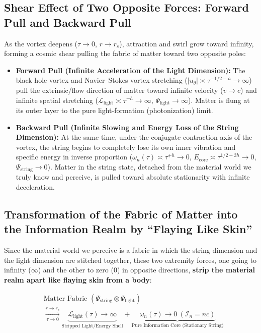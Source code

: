 \documentclass[12pt,a4paper]{article}
\begin{document}
\subsection{Shear Effect of Two Opposite Forces: Forward Pull and Backward Pull}

As the vortex deepens ($\tau \to 0$, $r \to r_s$), attraction and swirl grow toward infinity, forming a cosmic shear pulling the fabric of matter toward two opposite poles:

\begin{itemize}
    \item \textbf{Forward Pull (Infinite Acceleration of the Light Dimension):} The black hole vortex and Navier--Stokes vortex stretching ($|u_\theta| \asymp \tau^{-1/2-h} \to \infty$) pull the extrinsic/flow direction of matter toward infinite velocity ($v \to c$) and infinite spatial stretching ($\mathcal{L}_{\text{light}} \asymp \tau^{-h} \to \infty$, $\Psi_{\text{light}} \to \infty$). Matter is flung at its outer layer to the pure light-formation (photonization) limit.
    \item \textbf{Backward Pull (Infinite Slowing and Energy Loss of the String Dimension):} At the same time, under the conjugate contraction axis of the vortex, the string begins to completely lose its own inner vibration and specific energy in inverse proportion ($\omega_n(\tau) \asymp \tau^{+h} \to 0$, $E_{\text{core}} \asymp \tau^{1/2-3h} \to 0$, $\Psi_{\text{string}} \to 0$). Matter in the string state, detached from the material world we truly know and perceive, is pulled toward absolute stationarity with infinite deceleration.
\end{itemize}

\subsection{Transformation of the Fabric of Matter into the Information Realm by ``Flaying Like Skin''}

Since the material world we perceive is a fabric in which the string dimension and the light dimension are stitched together, these two extremity forces, one going to infinity ($\infty$) and the other to zero ($0$) in opposite directions, \textbf{strip the material realm apart like flaying skin from a body}:

\begin{equation}
\begin{split}
&\text{Matter Fabric } (\Psi_{\text{string}} \otimes \Psi_{\text{light}}) \\
&\xrightarrow[\tau \to 0]{r \to r_s} \underbrace{\mathcal{L}_{\text{light}}(\tau) \to \infty}_{\text{Stripped Light/Energy Shell}} + \underbrace{\omega_n(\tau) \to 0 \ (\mathcal{I}_n = n c)}_{\text{Pure Information Core (Stationary String)}}
\end{split}
\end{equation}
\end{document}

